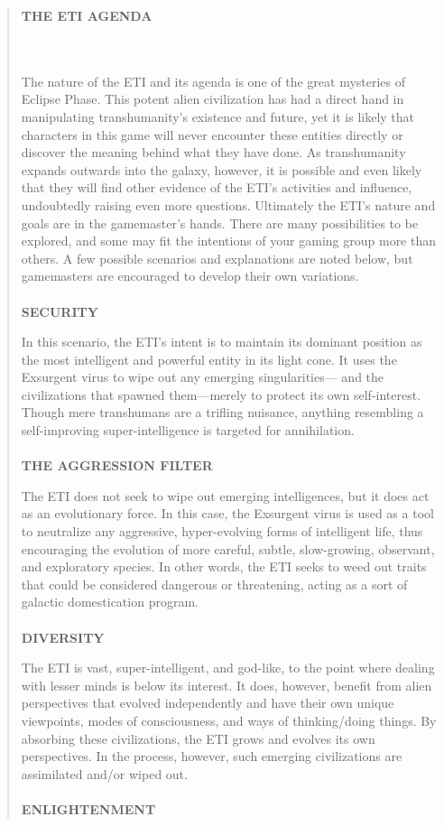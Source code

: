 \begin{quotation} \begin{large}\textbf{ THE ETI AGENDA} \end{large} \\ \\ The nature of the ETI and its agenda is one of the great mysteries of Eclipse Phase. This potent alien civilization has had a direct hand in manipulating transhumanity’s existence and future, yet it is likely that characters in this game will never encounter these entities directly or discover the meaning behind what they have done. As transhumanity expands outwards into the galaxy, however, it is possible and even likely that they will find other evidence of the ETI’s activities and influence, undoubtedly raising even more questions. Ultimately the ETI’s nature and goals are in the gamemaster’s hands. There are many possibilities to be explored, and some may fit the intentions of your gaming group more than others. A few possible scenarios and explanations are noted below, but gamemasters are encouraged to develop their own variations. \\ \\ \textbf{SECURITY} 

In this scenario, the ETI’s intent is to maintain its dominant position as the most intelligent and powerful entity in its light cone. It uses the Exsurgent virus to wipe out any emerging singularities— and the civilizations that spawned them—merely to protect its own self-interest. Though mere transhumans are a trifling nuisance, anything resembling a self-improving super-intelligence is targeted for annihilation. \\ \\ \textbf{THE AGGRESSION FILTER} 

The ETI does not seek to wipe out emerging intelligences, but it does act as an evolutionary force. In this case, the Exsurgent virus is used as a tool to neutralize any aggressive, hyper-evolving forms of intelligent life, thus encouraging the evolution of more careful, subtle, slow-growing, observant, and exploratory species. In other words, the ETI seeks to weed out traits that could be considered dangerous or threatening, acting as a sort of galactic domestication program. \\ \\ \textbf{DIVERSITY} 

The ETI is vast, super-intelligent, and god-like, to the point where dealing with lesser minds is below its interest. It does, however, benefit from alien perspectives that evolved independently and have their own unique viewpoints, modes of consciousness, and ways of thinking/doing things. By absorbing these civilizations, the ETI grows and evolves its own perspectives. In the process, however, such emerging civilizations are assimilated and/or wiped out. \\ \\ \textbf{ENLIGHTENMENT} 


\end{quotation}

